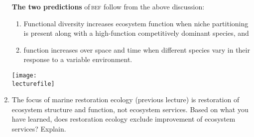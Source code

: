 \documentclass[letterpaper]{tufte-handout}
\newcommand\lecturefile{434_lecture05_instructor}
\begin{document}
\begin{enumerate}
	\textbf{The two predictions} of\,\textsc{bef} follow from the above discussion:
		\begin{enumerate}
			\item Functional diversity increases ecosystem function when niche partitioning is present along with a high-function competitively dominant species, and
			\item function increases over space and time when different species vary in their response to a variable environment.
		\end{enumerate}
	
	\begin{marginfigure}
		\texttt{[image: \\lecturefile]}
	\end{marginfigure}
	
	

	
	
	
	\item The focus of marine restoration ecology (previous lecture) is restoration of ecosystem structure and function, not ecosystem services. Based on what you have learned, does restoration ecology exclude improvement of ecosystem services?  Explain.
	
\end{enumerate}
\end{document}
